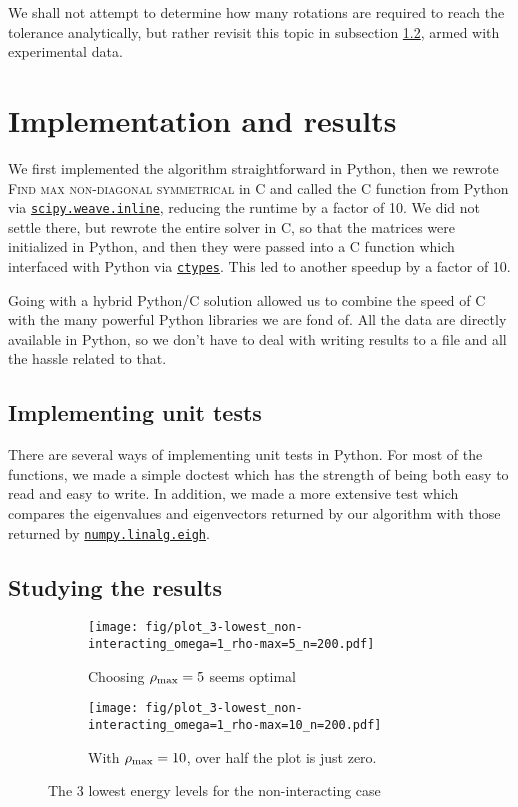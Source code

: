 \documentclass[a4paper]{article}
\begin{document}
We shall not attempt to determine how many rotations are required to reach the tolerance analytically, but rather revisit this topic in subsection \ref{subsec:studying_the_results}, armed with experimental data.

\section{Implementation and results}\label{sec:implementation_and_results}

We first implemented the algorithm straightforward in Python, then we rewrote \textsc{Find max non-diagonal symmetrical} in C and called the C function from Python via \href{http://docs.scipy.org/doc/scipy/reference/generated/scipy.weave.inline.html}{\texttt{scipy.weave.inline}}, reducing the runtime by a factor of 10. We did not settle there, but rewrote the entire solver in C, so that the matrices were initialized in Python, and then they were passed into a C function which interfaced with Python via \href{https://docs.python.org/2/library/ctypes.html}{\texttt{ctypes}}. This led to another speedup by a factor of 10.

Going with a hybrid Python/C solution allowed us to combine the speed of C with the many powerful Python libraries we are fond of. All the data are directly available in Python, so we don't have to deal with writing results to a file and all the hassle related to that.

\subsection{Implementing unit tests}
There are several ways of implementing unit tests in Python. For most of the functions, we made a simple doctest which has the strength of being both easy to read and easy to write. In addition, we made a more extensive test which compares the eigenvalues and eigenvectors returned by our algorithm with those returned by \href{http://docs.scipy.org/doc/numpy/reference/generated/numpy.linalg.eigh.html}{\texttt{numpy.linalg.eigh}}.

\subsection{Studying the results}\label{subsec:studying_the_results}
\begin{figure}[ht]
\begin{subfigure}[t]{0.5\textwidth}
\texttt{[image: fig/plot\_3-lowest\_non-interacting\_omega=1\_rho-max=5\_n=200.pdf]}
\caption{Choosing ${\rho_{\mathrm{max}}} = 5$ seems optimal}
\end{subfigure}
\begin{subfigure}[t]{0.5\textwidth}
\texttt{[image: fig/plot\_3-lowest\_non-interacting\_omega=1\_rho-max=10\_n=200.pdf]}
\caption{With ${\rho_{\mathrm{max}}} = 10$, over half the plot is just zero.}
\end{subfigure}
\caption{The 3 lowest energy levels for the non-interacting case}
\label{fig:non-interacting_compare_rho_max}
\end{figure}
\end{document}
